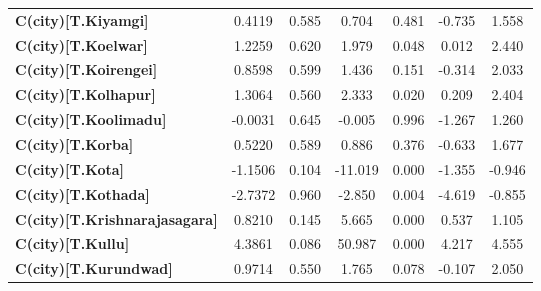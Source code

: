 \begin{center}
\begin{tabular}{lcccccc}
\textbf{C(city)[T.Kiyamgi]}                                                                         &       0.4119  &        0.585     &     0.704  &         0.481        &       -0.735    &        1.558     \\
\textbf{C(city)[T.Koelwar]}                                                                         &       1.2259  &        0.620     &     1.979  &         0.048        &        0.012    &        2.440     \\
\textbf{C(city)[T.Koirengei]}                                                                       &       0.8598  &        0.599     &     1.436  &         0.151        &       -0.314    &        2.033     \\
\textbf{C(city)[T.Kolhapur]}                                                                        &       1.3064  &        0.560     &     2.333  &         0.020        &        0.209    &        2.404     \\
\textbf{C(city)[T.Koolimadu]}                                                                       &      -0.0031  &        0.645     &    -0.005  &         0.996        &       -1.267    &        1.260     \\
\textbf{C(city)[T.Korba]}                                                                           &       0.5220  &        0.589     &     0.886  &         0.376        &       -0.633    &        1.677     \\
\textbf{C(city)[T.Kota]}                                                                            &      -1.1506  &        0.104     &   -11.019  &         0.000        &       -1.355    &       -0.946     \\
\textbf{C(city)[T.Kothada]}                                                                         &      -2.7372  &        0.960     &    -2.850  &         0.004        &       -4.619    &       -0.855     \\
\textbf{C(city)[T.Krishnarajasagara]}                                                               &       0.8210  &        0.145     &     5.665  &         0.000        &        0.537    &        1.105     \\
\textbf{C(city)[T.Kullu]}                                                                           &       4.3861  &        0.086     &    50.987  &         0.000        &        4.217    &        4.555     \\
\textbf{C(city)[T.Kurundwad]}                                                                       &       0.9714  &        0.550     &     1.765  &         0.078        &       -0.107    &        2.050     \\

\end{tabular}
\end{center}
